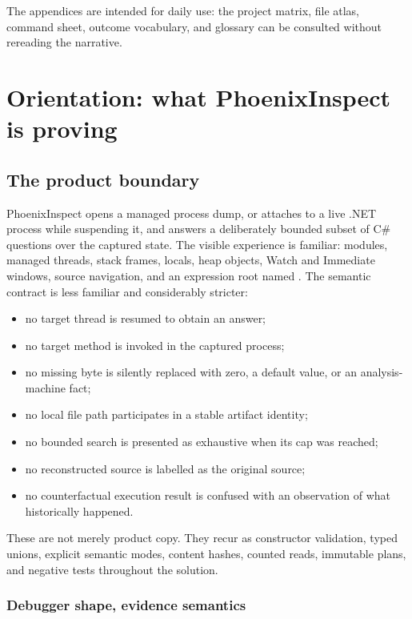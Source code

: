 \documentclass[11pt,oneside,openany]{book}
\newcommand{\codeinline}[1]{\texttt{\detokenize{#1}}}
\begin{document}
The appendices are intended for daily use: the project matrix, file atlas, command sheet, outcome vocabulary, and glossary can be consulted without rereading the narrative.

\tableofcontents

\mainmatter

\chapter{Orientation: what PhoenixInspect is proving}
\label{ch:orientation}

\section{The product boundary}

PhoenixInspect opens a managed process dump, or attaches to a live .NET process while suspending it, and answers a deliberately bounded subset of C\# questions over the captured state. The visible experience is familiar: modules, managed threads, stack frames, locals, heap objects, Watch and Immediate windows, source navigation, and an expression root named \codeinline{root}. The semantic contract is less familiar and considerably stricter:

\begin{itemize}
  \item no target thread is resumed to obtain an answer;
  \item no target method is invoked in the captured process;
  \item no missing byte is silently replaced with zero, a default value, or an analysis-machine fact;
  \item no local file path participates in a stable artifact identity;
  \item no bounded search is presented as exhaustive when its cap was reached;
  \item no reconstructed source is labelled as the original source;
  \item no counterfactual execution result is confused with an observation of what historically happened.
\end{itemize}

These are not merely product copy. They recur as constructor validation, typed unions, explicit semantic modes, content hashes, counted reads, immutable plans, and negative tests throughout the solution.

\subsection{Debugger shape, evidence semantics}
\end{document}
